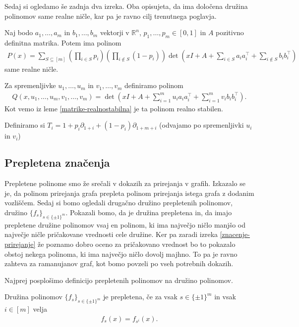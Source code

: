 Sedaj si ogledamo še zadnja dva izreka. Oba opisujeta, da ima določena družina polinomov same realne ničle, kar pa je ravno cilj trenutnega poglavja.
\begin{izrek}
    Naj bodo \(a_1, \ldots, a_m\) in \(b_1, \ldots, b_m\) vektorji v \(\mathbb R^n\), \(p_1,\ldots, p_m \in [0,1]\) in \(A\) pozitivno definitna matrika. Potem ima polinom
    \begin{align*}
        P(x) = \sum_{S\subseteq [m]} \left(\prod_{i\in S} p_i\right)\left(\prod_{i\notin S} \left(1-p_i\right)\right) \det\left(xI + A + \sum_{i\in S} a_i a_i^\top + \sum_{i\notin S} b_i b_i^\top\right)
    \end{align*}
    same realne ničle.
\end{izrek}
\begin{dokaz}
    Za spremenljivke \(u_1,\ldots, u_m\) in \(v_1,\ldots, v_m\) definiramo polinom
    \begin{align*}
        Q(x, u_1, \ldots, u_m, v_1, \ldots, v_m) = \det\left(xI + A + \sum_{i=1}^m u_i a_i a_i^\top + \sum_{i=1}^m v_i b_i b_i^\top\right).
    \end{align*}
    Kot vemo iz leme \ref{matrike-realnostabilna} je ta polinom realno stabilen.

    Definiramo si \(T_i = 1+p_i\partial_{1+i} + (1-p_i)\partial_{1+m+i}\) (odvajamo po spremenljivki \(u_i\) in \(v_i\))
\end{dokaz}

\subsection{Prepletena značenja}
Prepletene polinome smo že srečali v dokazih za prirejanja v grafih. Izkazalo se je, da polinom prirejanja grafa prepleta polinom prirejanja istega grafa z dodanim vozliščem. Sedaj si bomo ogledali drugačno družino prepletenih polinomov, družino \(\{f_s\}_{s\in \{\pm 1\}^m}\). Pokazali bomo, da je družina prepletena in, da imajo prepletene družine polinomov vsaj en polinom, ki ima največjo ničlo manjšo od največje ničle pričakovane vrednosti cele družine. Ker pa zaradi izreka \ref{znacenje-prirejanje} že poznamo dobro oceno za pričakovano vrednost bo to pokazalo obstoj nekega polinoma, ki ima največjo ničlo dovolj majhno. To pa je ravno zahteva za ramanujanov graf, kot bomo povzeli po vseh potrebnih dokazih.

Najprej posplošimo definicijo prepletenih polinomov na družino polinomov.

\begin{definicija}

    Družina polinomov \(\{f_s\}_{s\in \{\pm 1\}^m}\) je prepletena, če za vsak \(s\in \{\pm 1\}^m\) in vsak \(i\in [m]\) velja
    \begin{align*}
        f_s(x) = f_{s^i}(x).
    \end{align*}
\end{definicija}